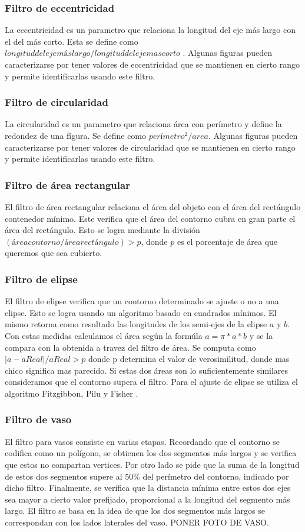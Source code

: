 	\subsubsection*{Filtro de eccentricidad}
	La eccentricidad es un parametro que relaciona la longitud del eje más largo con el del más corto. Esta se define como 
	$longitud del eje más largo/ longitud del eje mas corto$ . Algunas figuras pueden caracterizarse por tener valores de eccentricidad
	que se mantienen en cierto rango y permite identificarlas usando este filtro.
	\subsubsection*{Filtro de circularidad}
	La circularidad es un parametro que relaciona área con perímetro y define la redondez de una fígura. Se define como $perímetro^2/area$. Algunas figuras pueden 
	caracterizarse por tener valores de circularidad que se mantienen en cierto rango y permite identificarlas usando este filtro.
	\subsubsection*{Filtro de área rectangular}
	El filtro de área rectangular relaciona el área del objeto con el área del rectángulo contenedor mínimo. Este verifica que el área
	del contorno cubra en gran parte el área del rectángulo. Esto se logra mediante la división $(área contorno / área rectángulo)> p$, donde 
	$p$ es el porcentaje de área que queremos que sea cubierto.
	\subsubsection*{Filtro de elipse}
	El filtro de elipse verifica que un contorno determinado se ajuste o no a una elipse. Esto se logra usando un algoritmo basado 
	en cuadrados mínimos. El mismo retorna como resultado las longitudes de los semi-ejes de la elipse $a$ y $b$. Con estas medidas calculamos
	el área según la formúla $a=\pi*a*b$ y se la compara con la obtenida a travez del filtro de área. Se computa como $|a-aReal|/ aReal > p$ donde p determina el
	valor de verosimilitud, donde mas chico significa mas parecido. Si estas dos áreas son lo suficientemente similares consideramos que el contorno supera el filtro. 
	Para el ajuste de elipse se utiliza el algoritmo Fitzgibbon, Pilu y Fisher \cite{Fitzgibbon99}.
	\subsubsection*{Filtro de vaso}
	El filtro para vasos consiste en varias etapas. Recordando que el contorno se codifica como un polígono, se obtienen los dos segmentos 
	más largos y se verifica que estos no compartan vertices. Por otro lado se pide que la suma de la longitud de estos dos segmentos supere al $50\%$ del 
	perímetro del contorno, indicado por dicho filtro. Finalmente, se verifica que la distancia mínima entre estos dos ejes sea mayor a cierto valor prefijado, proporcional a la
	longitud del segmento más largo. El filtro se basa en la idea de que los dos segmentos más largos se correspondan con los lados laterales del vaso. PONER FOTO
	DE VASO.
